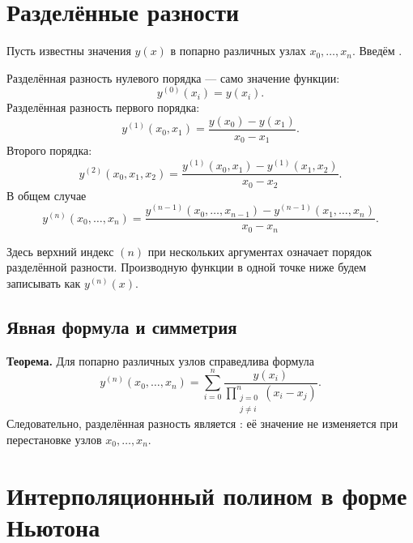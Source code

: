 \documentclass[../final.tex]{subfiles}
\begin{document}
\section{Разделённые разности}

Пусть известны значения $y(x)$ в попарно различных узлах
$x_0,\ldots,x_n$. Введём .

Разделённая разность нулевого порядка --- само значение функции:
%
\begin{equation*}
    y^{(0)}(x_i)=y(x_i).
\end{equation*}
%
Разделённая разность первого порядка:
%
\begin{equation*}
    y^{(1)}(x_0,x_1)=\frac{y(x_0)-y(x_1)}{x_0-x_1}.
\end{equation*}
%
Второго порядка:
%
\begin{equation*}
    y^{(2)}(x_0,x_1,x_2)
    =\frac{y^{(1)}(x_0,x_1)-y^{(1)}(x_1,x_2)}{x_0-x_2}.
\end{equation*}
%
В общем случае
%
\begin{equation}
    y^{(n)}(x_0,\ldots,x_n)
    =\frac{y^{(n-1)}(x_0,\ldots,x_{n-1})
          -y^{(n-1)}(x_1,\ldots,x_n)}{x_0-x_n}.
    \label{eq:ovf_divided_difference}
\end{equation}

\remark
Здесь верхний индекс $(n)$ при нескольких аргументах означает порядок
разделённой разности. Производную функции в одной точке ниже будем
записывать как $y^{(n)}(x)$.

\subsection{Явная формула и симметрия}

\textbf{Теорема.} Для попарно различных узлов справедлива формула
%
\begin{equation*}
    y^{(n)}(x_0,\ldots,x_n)
    =\sum_{i=0}^{n}
    \frac{y(x_i)}{\displaystyle\prod_{\substack{j=0\\j\ne i}}^{n}(x_i-x_j)}.
\end{equation*}
%
Следовательно, разделённая разность является
: её значение
не изменяется при перестановке узлов $x_0,\ldots,x_n$.

\section{Интерполяционный полином в форме Ньютона}
\end{document}
